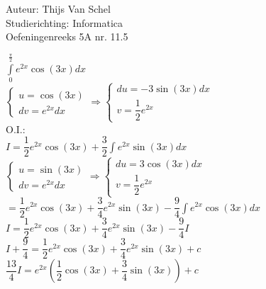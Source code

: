 \documentclass[a4paper]{article}
\newcommand{\dint}{\displaystyle\int}
\newcommand{\bdint}{\displaystyle\int\limits_0^{\tfrac{\pi}{2}}}
\begin{document}
  
\noindent \large Auteur: Thijs Van Schel \\
\noindent \large Studierichting: Informatica\\
\noindent \large Oefeningenreeks 5A nr. 11.5\\

\medskip

$\bdint e^{2x} \cos(3x)dx$\\

$\left\{
   \begin{array}{l}
       u = \cos(3x)\\ 
			
       dv =  e^{2x}dx
   \end{array}
\right.
\Rightarrow
\left\{
   \begin{array}{l}
       du = -3\sin(3x)dx \\
			
       v =  \dfrac{1}{2}e^{2x}
   \end{array}
\right.$\\

O.I.:\\

$I = \dfrac{1}{2}e^{2x}\cos(3x) + \dfrac{3}{2}\dint e^{2x}\sin(3x)dx$\\

$\left\{
   \begin{array}{l}
       u = \sin(3x)\\ 
			
       dv =  e^{2x}dx
   \end{array}
\right.
\Rightarrow
\left\{
   \begin{array}{l}
       du = 3\cos(3x)dx \\
			
       v =  \dfrac{1}{2}e^{2x}
   \end{array}
\right.$\\

$ = \dfrac{1}{2}e^{2x}\cos(3x) + \dfrac{3}{4}e^{2x}\sin(3x) - \dfrac{9}{4}\dint e^{2x}\cos(3x)dx$\\

$I = \dfrac{1}{2}e^{2x}\cos(3x) + \dfrac{3}{4}e^{2x}\sin(3x) - \dfrac{9}{4}I$\\

$I + \dfrac{9}{4} = \dfrac{1}{2}e^{2x}\cos(3x) + \dfrac{3}{4}e^{2x}\sin(3x)+c$\\

$\dfrac{13}{4}I = e^{2x}\left(\dfrac{1}{2}\cos(3x) + \dfrac{3}{4}\sin(3x)\right)+c$\\
\end{document}
